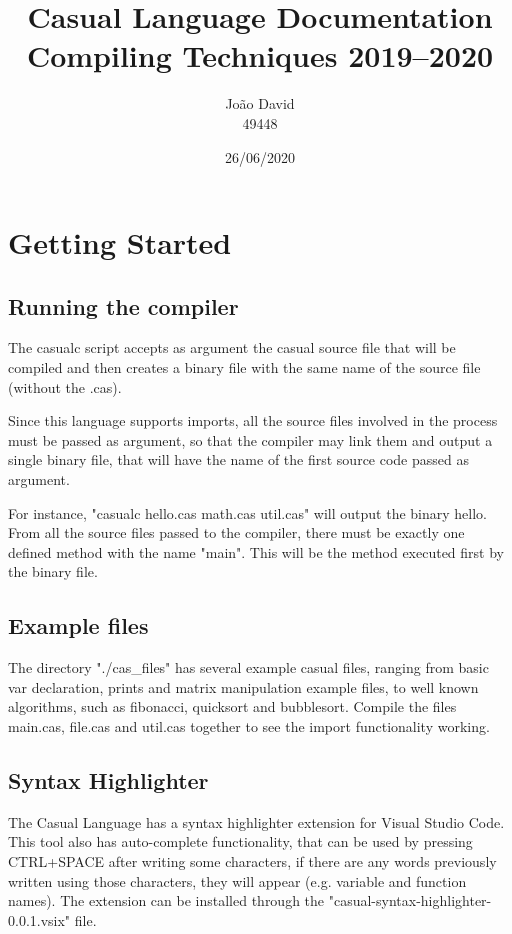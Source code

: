 \documentclass[12pt]{article}
\title{Casual Language Documentation \\
  \Large Compiling Techniques 2019--2020
}
\author{
  João David\\49448
}
\date{26/06/2020}
\begin{document}
\maketitle


\section{Getting Started}
\subsection{Running the compiler}
The casualc script accepts as argument the casual source file that will be compiled and then creates a binary file with the same name of the source file (without the .cas). 

Since this language supports imports, all the source files involved in the process must be passed as argument, so that the compiler may link them and output a single binary file, that will have the name of the first source code passed as argument.

For instance, "casualc hello.cas math.cas util.cas" will output the binary hello.
From all the source files passed to the compiler, there must be exactly one defined method with the name "main". This will be the method executed first by the binary file.

\subsection{Example files}
The directory "./cas\_files" has several example casual files, ranging from basic var declaration, prints and matrix manipulation example files, to well known algorithms, such as fibonacci, quicksort and bubblesort.
Compile the files main.cas, file.cas and util.cas together to see the import functionality working.

\newpage

\subsection{Syntax Highlighter}
The Casual Language has a syntax highlighter extension for Visual Studio Code. This tool also has auto-complete functionality, that can be used by pressing CTRL+SPACE after writing some characters, if there are any words previously written using those characters, they will appear (e.g. variable and function names).
The extension can be installed through the "casual-syntax-highlighter-0.0.1.vsix" file.\\
\end{document}
